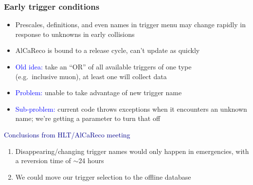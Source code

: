\documentclass[compress]{beamer}
\begin{document}
\begin{frame}
\frametitle{Early trigger conditions}
\begin{itemize}\setlength{\itemsep}{0.2 cm}
\item Prescales, definitions, and even names in trigger menu may
  change rapidly in response to unknowns in early collisions
\item AlCaReco is bound to a release cycle, can't update as quickly
\item \textcolor{blue}{Old idea:} take an ``OR'' of all available
  triggers of one type \\ (e.g.\ inclusive muon), at least one will
  collect data
\item \textcolor{blue}{Problem:} unable to take advantage of new trigger name
\item \textcolor{blue}{Sub-problem:} current code throws exceptions
  when it encounters an unknown name; we're getting a parameter to
  turn that off
\end{itemize}

\vspace{0.2 cm}
\hspace{-0.83 cm} \textcolor{darkblue}{\Large Conclusions from HLT/AlCaReco meeting}

\vspace{0.05 cm}
\begin{enumerate}
\item Disappearing/changing trigger names would only happen in emergencies, with a reversion time of $\sim$24 hours
\item We could move our trigger selection to the offline database
\end{enumerate}
\end{frame}
\end{document}
